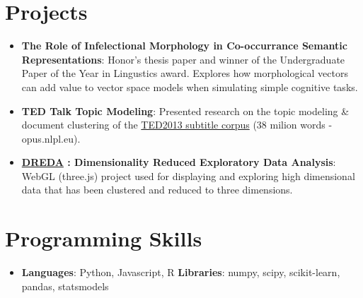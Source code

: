 \documentclass[letterpaper,11pt]{article}
\newcommand{\resumeItem}[2]{
  \item\small{
    \textbf{#1}{: #2 \vspace{-2pt}}
  }
}
\newcommand{\resumeSubItem}[2]{\resumeItem{#1}{#2}\vspace{-4pt}}
\newcommand{\resumeSubHeadingListStart}{\begin{itemize}[leftmargin=*]}
\newcommand{\resumeSubHeadingListEnd}{\end{itemize}}
\begin{document}
\section{Projects}
  \resumeSubHeadingListStart
    \resumeSubItem{The Role of Infelectional Morphology in Co-occurrance Semantic Representations}
    {Honor's thesis paper and winner of the Undergraduate Paper of the Year in Lingustics award. Explores how morphological vectors can add value to vector space models when simulating simple cognitive tasks.}
    \resumeSubItem{TED Talk Topic Modeling}
      {Presented research on the topic modeling \& document clustering of the \href{http://opus.nlpl.eu/TED2013.php}{TED2013 subtitle corpus} (38 milion words - opus.nlpl.eu).}
    \resumeSubItem{\href{https://metasyn.pw/dreda}{DREDA} : Dimensionality Reduced Exploratory Data Analysis}
      {WebGL (three.js) project used for displaying and exploring high dimensional data that has been clustered and reduced to three dimensions.}
  \resumeSubHeadingListEnd
 

\section{Programming Skills}
 \resumeSubHeadingListStart
    \item{
      \textbf{Languages}{: Python, Javascript, R}
      \hfill
      \textbf{Libraries}{: numpy, scipy, scikit-learn, pandas, statsmodels}
    }
  \resumeSubHeadingListEnd


\end{document}
